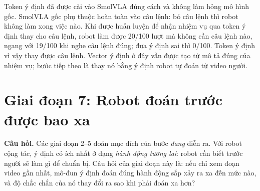 \documentclass[a4paper,oneside]{report}
\begin{document}
\begin{ketqua}
Token ý định đã được cài vào SmolVLA đúng cách và không làm hỏng mô hình gốc. SmolVLA gốc phụ thuộc hoàn toàn vào câu lệnh: bỏ câu lệnh thì robot không làm xong việc nào. Khi được huấn luyện để nhận nhiệm vụ qua token ý định thay cho câu lệnh, robot làm được 20/100 lượt mà không cần câu lệnh nào, ngang với 19/100 khi nghe câu lệnh đúng; đưa ý định sai thì 0/100. Token ý định vì vậy thay được câu lệnh. Vector ý định ở đây vẫn được tạo từ mô tả đúng của nhiệm vụ; bước tiếp theo là thay nó bằng ý định robot tự đoán từ video người.
\end{ketqua}


\section{Giai đoạn 7: Robot đoán trước được bao xa}
\label{sec:stage7}

\textbf{Câu hỏi.} Các giai đoạn 2--5 đoán mục đích của bước \textit{đang} diễn ra. Với robot cộng tác, ý định có ích nhất ở dạng \textit{hành động tương lai}: robot cần biết trước người sẽ làm gì để chuẩn bị. Câu hỏi của giai đoạn này là: nếu chỉ xem đoạn video gần nhất, mô-đun ý định đoán đúng hành động sắp xảy ra xa đến mức nào, và độ chắc chắn của nó thay đổi ra sao khi phải đoán xa hơn?
\end{document}
